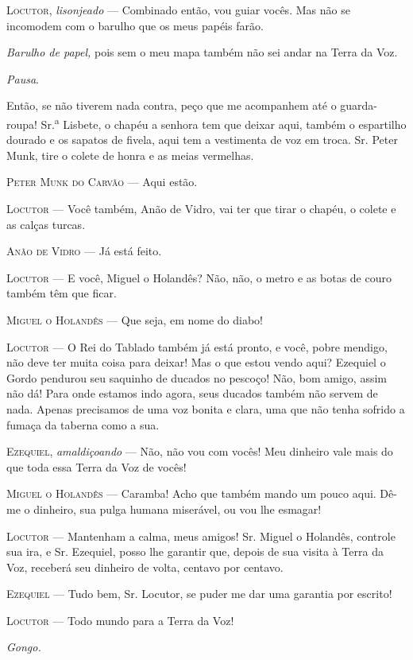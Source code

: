 \textsc{Locutor}, \emph{lisonjeado} --- Combinado então, vou guiar vocês. Mas não
se incomodem com o barulho que os meus papéis farão.

\emph{Barulho de papel,} pois sem o meu mapa também não sei andar na
Terra da Voz.

\emph{Pausa}.

Então, se não tiverem nada contra, peço que me acompanhem até o
guarda-roupa! Sr.\textsuperscript{a} Lisbete, o chapéu a senhora tem que
deixar aqui, também o espartilho dourado e os sapatos de fivela, aqui
tem a vestimenta de voz em troca. Sr. Peter Munk, tire o colete de honra
e as meias vermelhas.

\textsc{Peter Munk do Carvão} --- Aqui estão.

\textsc{Locutor} --- Você também, Anão de Vidro, vai ter que tirar o chapéu, o
colete e as calças turcas.

\textsc{Anão de Vidro} --- Já está feito.

\textsc{Locutor} --- E você, Miguel o Holandês? Não, não, o metro e as botas de
couro também têm que ficar.

\textsc{Miguel o Holandês} --- Que seja, em nome do diabo!

\textsc{Locutor} --- O Rei do Tablado também já está pronto, e você, pobre
mendigo, não deve ter muita coisa para deixar! Mas o que estou vendo
aqui? Ezequiel o Gordo pendurou seu saquinho de ducados no pescoço! Não,
bom amigo, assim não dá! Para onde estamos indo agora, seus ducados
também não servem de nada. Apenas precisamos de uma voz bonita e clara,
uma que não tenha sofrido a fumaça da taberna como a sua.

\textsc{Ezequiel}, \emph{amaldiçoando} --- Não, não vou com vocês! Meu dinheiro
vale mais do que toda essa Terra da Voz de vocês!

\textsc{Miguel o Holandês} --- Caramba! Acho que também mando um pouco aqui. Dê-me
o dinheiro, sua pulga humana miserável, ou vou lhe esmagar!

\textsc{Locutor} --- Mantenham a calma, meus amigos! Sr. Miguel o Holandês,
controle sua ira, e Sr. Ezequiel, posso lhe garantir que, depois de sua
visita à Terra da Voz, receberá seu dinheiro de volta, centavo por
centavo.

\textsc{Ezequiel} --- Tudo bem, Sr. Locutor, se puder me dar uma garantia por
escrito!

\textsc{Locutor} --- Todo mundo para a Terra da Voz!

\emph{Gongo.}

